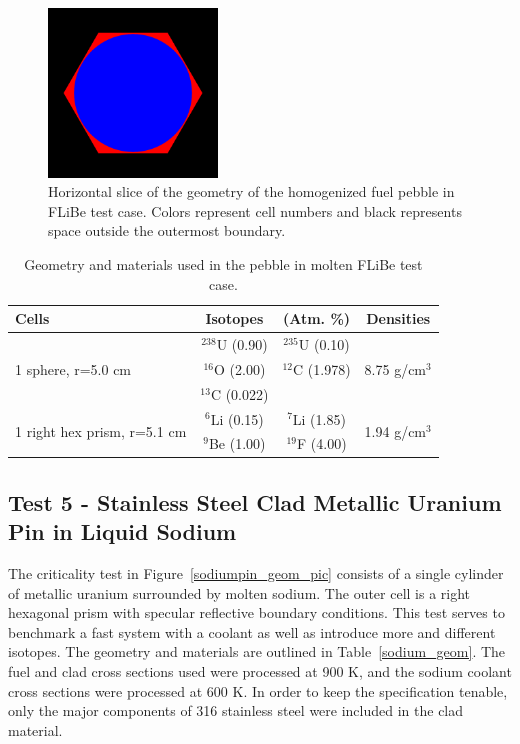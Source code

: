 \documentclass[preprint,12pt]{elsarticle}
\begin{document}
\begin{figure}[h!] 
  \centering
    \includegraphics[width=0.4\textwidth]{graphics/flibe-xy.png}
     \caption{ Horizontal slice of the geometry of the homogenized fuel pebble in FLiBe test case.  Colors represent cell numbers and black represents space outside the outermost boundary. \label{flibe_geom_pic} }
\end{figure}

\begin{table}[h]
\centering
\caption{Geometry and materials used in the pebble in molten FLiBe test case.}
\label{pebble_geom}
\begin{tabular}{| l | c  c | c |}
\hline
Cells & Isotopes & (Atm.  \%)& Densities \\
\hline
\multirow{3}{*}{1 sphere, r=5.0 cm }  &   $^{238}$U   (0.90) &  $^{235}$U   (0.10) &  \multirow{3}{*}{8.75 g/cm$^3$} \\
                                      &   $^{16}$O    (2.00) &  $^{12}$C    (1.978) &  \\
                                      &   $^{13}$C    (0.022)&                     &  \\
\hline
\multirow{2}{*}{1 right hex prism, r=5.1 cm }  &   $^{6}$Li  (0.15) &  $^{7}$Li  (1.85)&  \multirow{2}{*}{1.94 g/cm$^3$} \\
                                               &  $^{9}$Be  (1.00) & $^{19}$F  (4.00) &  \\
\hline
\end{tabular}
\end{table}

\newpage
\subsection{Test 5 - Stainless Steel Clad Metallic Uranium Pin in Liquid Sodium}

The criticality test in Figure~\ref{sodiumpin_geom_pic} consists of a single cylinder of metallic uranium surrounded by molten sodium.  The outer cell is a right hexagonal prism with specular reflective boundary conditions.  This test serves to benchmark a fast system with a coolant as well as introduce more and different isotopes.  The geometry and materials are outlined in Table~\ref{sodium_geom}.  The fuel and clad cross sections used were processed at 900 K, and the sodium coolant cross sections were processed at 600 K.  In order to keep the specification tenable, only the major components of 316 stainless steel were included in the clad material. 
\end{document}
